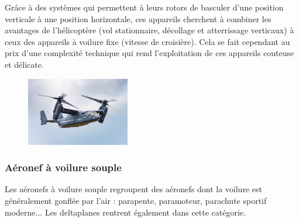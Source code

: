 		Grâce à des systèmes qui permettent à leurs rotors de basculer d'une position verticale à une position horizontale, ces appareils cherchent à combiner les avantages de l'hélicoptère (vol stationnaire, décollage et atterrissage verticaux) à ceux des appareils à voilure fixe (vitesse de croisière). Cela se fait cependant au prix d'une complexité technique qui rend l'exploitation de ces appareils couteuse et délicate.
		
	\begin{figure}[H]
  	\centering
    \includegraphics[width=0.4\textwidth]{01-EtudeAeronefs/img/tiltrotor.jpg}
	\end{figure}	
		
	\subsubsection{Aéronef à voilure souple}
	Les aéronefs à voilure souple  regroupent des aéronefs dont la voilure est généralement gonflée par l'air : parapente, paramoteur, parachute sportif moderne... Les deltaplanes rentrent également dans cette catégorie.
	
	
